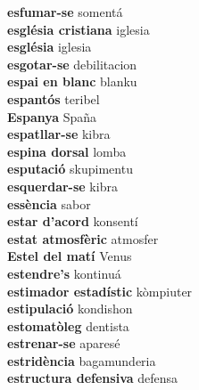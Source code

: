 \textbf{ esfumar-se  } somentá \\
\textbf{ església cristiana  } iglesia \\
\textbf{ església  } iglesia \\
\textbf{ esgotar-se  } debilitacion \\
\textbf{ espai en blanc  } blanku \\
\textbf{ espantós  } teribel \\
\textbf{ Espanya  } Spaña \\
\textbf{ espatllar-se  } kibra \\
\textbf{ espina dorsal  } lomba \\
\textbf{ esputació  } skupimentu \\
\textbf{ esquerdar-se  } kibra \\
\textbf{ essència  } sabor \\
\textbf{ estar d’acord  } konsentí \\
\textbf{ estat atmosfèric  } atmosfer \\
\textbf{ Estel del matí  } Venus \\
\textbf{ estendre’s  } kontinuá \\
\textbf{ estimador estadístic  } kòmpiuter \\
\textbf{ estipulació  } kondishon \\
\textbf{ estomatòleg  } dentista \\
\textbf{ estrenar-se  } aparesé \\
\textbf{ estridència  } bagamunderia \\
\textbf{ estructura defensiva  } defensa \\
